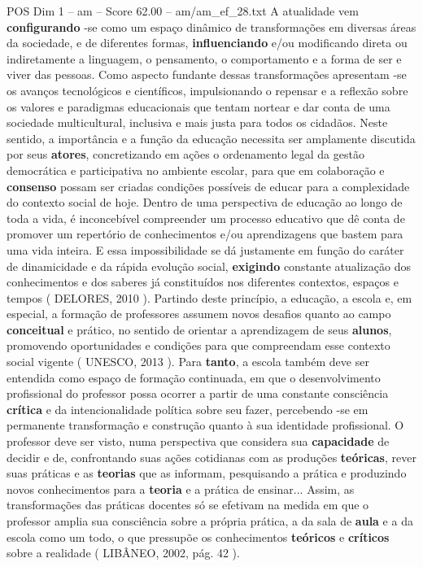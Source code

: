 \begin{textsample}{POS Dim 1 – am – Score 62.00 – am/am\_ef\_28.txt}  \label{ex:f1_pos_223}
A atualidade vem \textbf{configurando} -se como um espaço dinâmico de transformações em diversas áreas da sociedade, e de diferentes formas, \textbf{influenciando} e/ou modificando direta ou indiretamente a linguagem, o pensamento, o comportamento e a forma de ser e viver das pessoas.
Como aspecto fundante dessas transformações apresentam -se os avanços tecnológicos e científicos, impulsionando o repensar e a reflexão sobre os valores e paradigmas educacionais que tentam nortear e dar conta de uma sociedade multicultural, inclusiva e mais justa para todos os cidadãos.
Neste sentido, a importância e a função da educação necessita ser amplamente discutida por seus \textbf{atores}, concretizando em ações o ordenamento legal da gestão democrática e participativa no ambiente escolar, para que em colaboração e \textbf{consenso} possam ser criadas condições possíveis de educar para a complexidade do contexto social de hoje.
Dentro de uma perspectiva de educação ao longo de toda a vida, é inconcebível compreender um processo educativo que dê conta de promover um repertório de conhecimentos e/ou aprendizagens que bastem para uma vida inteira.
E essa impossibilidade se dá justamente em função do caráter de dinamicidade e da rápida evolução social, \textbf{exigindo} constante atualização dos conhecimentos e dos saberes já constituídos nos diferentes contextos, espaços e tempos ( DELORES, 2010 ).
Partindo deste princípio, a educação, a escola e, em especial, a formação de professores assumem novos desafios quanto ao campo \textbf{conceitual} e prático, no sentido de orientar a aprendizagem de seus \textbf{alunos}, promovendo oportunidades e condições para que compreendam esse contexto social vigente ( UNESCO, 2013 ).
Para \textbf{tanto}, a escola também deve ser entendida como espaço de formação continuada, em que o desenvolvimento profissional do professor possa ocorrer a partir de uma constante consciência \textbf{crítica} e da intencionalidade política sobre seu fazer, percebendo -se em permanente transformação e construção quanto à sua identidade profissional.
O professor deve ser visto, numa perspectiva que considera sua \textbf{capacidade} de decidir e de, confrontando suas ações cotidianas com as produções \textbf{teóricas}, rever suas práticas e as \textbf{teorias} que as informam, pesquisando a prática e produzindo novos conhecimentos para a \textbf{teoria} e a prática de ensinar...
Assim, as transformações das práticas docentes só se efetivam na medida em que o professor amplia sua consciência sobre a própria prática, a da sala de \textbf{aula} e a da escola como um todo, o que pressupõe os conhecimentos \textbf{teóricos} e \textbf{críticos} sobre a realidade ( LIBÂNEO, 2002, pág. 42 ).

\end{textsample}

